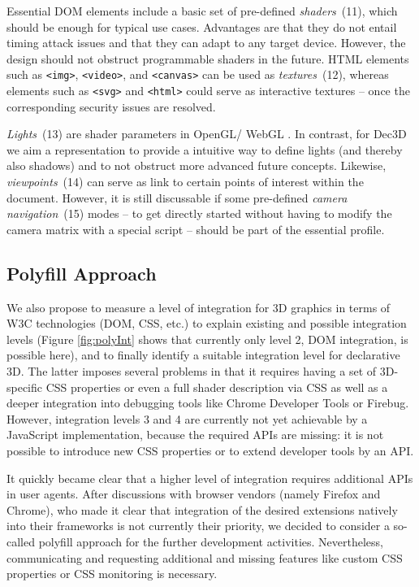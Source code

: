 \documentclass{acmsiggraph}
\begin{document}
Essential DOM elements include a basic set of pre-defined \textit{shaders}~(11), which should be enough for typical use cases. Advantages are that they do not entail timing attack issues and that they can adapt to any target device. However, the design should not obstruct programmable shaders in the future. HTML elements such as \verb|<img>|, \verb|<video>|, and \verb|<canvas>| can be used as \textit{textures}~(12), whereas elements such as \verb|<svg>| and \verb|<html>| could serve as interactive textures -- once the corresponding security issues are resolved.

\textit{Lights}~(13) are shader parameters in OpenGL/ WebGL \cite{WebGL12}. In contrast, for Dec3D we aim a representation to provide a intuitive way to define lights (and thereby also shadows) and to not obstruct more advanced future concepts.
Likewise, \textit{viewpoints}~(14) can serve as link to certain points of interest within the document. However, it is still discussable if some pre-defined \textit{camera navigation}~(15) modes -- to get directly started without having to modify the camera matrix with a special script -- should be part of the essential profile.


\subsection{Polyfill Approach}
\label{subsection:polyfill}

We also propose to measure a level of integration for 3D graphics in terms of W3C technologies (DOM, CSS, etc.) to explain existing and possible integration levels (Figure \ref{fig:polyInt} shows that currently only level 2, DOM integration, is possible here), and to finally identify a suitable integration level for declarative 3D. The latter imposes several problems in that it requires having a set of 3D-specific CSS properties or even a full shader description via CSS as well as a deeper integration into debugging tools like Chrome Developer Tools or Firebug. However, integration levels 3 and 4 are currently not yet achievable by a JavaScript implementation, because the required APIs are missing: it is not possible to introduce new CSS properties or to extend developer tools by an API.

It quickly became clear that a higher level of integration requires additional APIs in user agents. After discussions with browser vendors (namely Firefox and Chrome), who made it clear that integration of the desired extensions natively into their frameworks is not currently their priority, we decided to consider a so-called polyfill approach for the further development activities.
Nevertheless, communicating and requesting additional and missing features like custom CSS properties or CSS monitoring is necessary.
\end{document}
